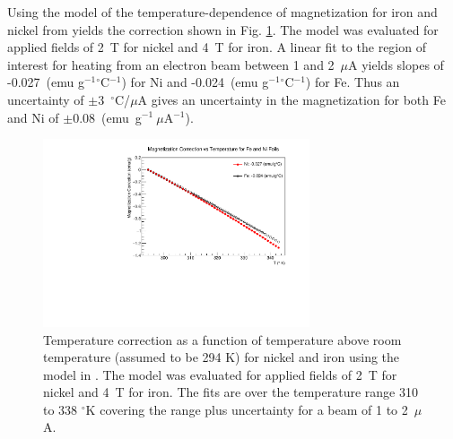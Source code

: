 \documentclass[12pt]{article}
\begin{document}
Using the model of the temperature-dependence of magnetization for iron and nickel from \cite{PauthenetMar1982,PauthenetNov1982} yields the correction shown in Fig. \ref{fig:temperature_correction}. The model was evaluated for applied fields of 2~T for nickel and 4~T for iron. A linear fit to the region of interest for heating from an electron beam between 1 and 2~$\mu$A yields slopes of -0.027~(emu g$^{-1}$$^{\circ}$C$^{-1}$) for Ni and  -0.024~(emu g$^{-1}$$^{\circ}$C$^{-1}$) for Fe. Thus an uncertainty of $\pm$3~$^{\circ}$C/$\mu$A gives an uncertainty in the magnetization for both Fe and Ni of $\pm0.08$~(emu~g$^{-1}~\mu$A$^{-1}$).
\begin{figure}[ht]
\centering
\includegraphics[width=0.7\textwidth]{target_heating_correction.pdf}
\caption{Temperature correction as a function of temperature above room temperature (assumed to be 294 K) for nickel and iron using the model in \cite{PauthenetMar1982,PauthenetNov1982}. The model was evaluated for applied fields of 2~T for nickel and 4~T for iron. The fits are over the temperature range 310 to 338 $^{\circ}$K covering the range plus uncertainty for a beam of 1 to 2~$\mu$A.}
\label{fig:temperature_correction}
\end{figure}
\end{document}
